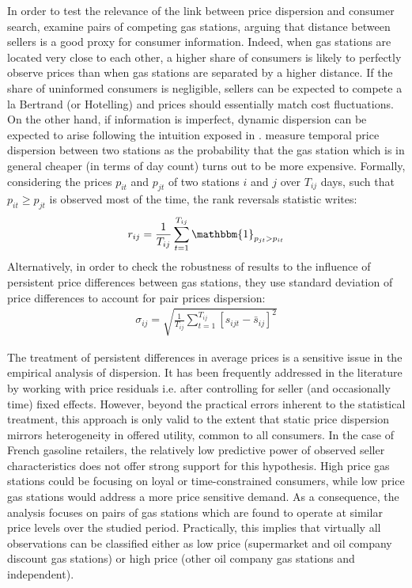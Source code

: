 \documentclass[english]{article}
\begin{document}
In order to test the relevance of the link between price dispersion and consumer search, \cite{TAP11} examine pairs of competing gas stations, arguing that distance between sellers is a good proxy for consumer information. Indeed, when gas stations are located very close to each other, a higher share of consumers is likely to perfectly observe prices than when gas stations are separated by a higher distance. If the share of uninformed consumers is negligible, sellers can be expected to compete a la Bertrand (or Hotelling) and prices should essentially match cost fluctuations. On the other hand, if information is imperfect, dynamic dispersion can be expected to arise following the intuition exposed in \cite{VAR80}. \cite{TAP11} measure temporal price dispersion between two stations as the probability that the gas station which is in general cheaper (in terms of day count) turns out to be more expensive. Formally, considering the prices $p_{it}$ and $p_{jt}$ of two stations $i$ and $j$ over $T_{ij}$ days, such that $p_{it} \ge p_{jt}$ is observed most of the time, the rank reversals statistic writes:
\begin{align*}
r_{ij} = \frac{1}{T_{ij}} \sum_{t=1}^{T_{ij}} \mathbbm{1}_{p_{jt} > p_{it}}
\end{align*}
Alternatively, in order to check the robustness of results to the influence of persistent price differences between gas stations, they use standard deviation of price differences to account for pair prices dispersion:
\begin{align*}
\sigma_{ij} = \sqrt{\frac{1}{T_{ij}} \sum_{t=1}^{T_{ij}} [s_{ijt} - \bar{s}_{ij}]^2}
\end{align*}

The treatment of persistent differences in average prices is a sensitive issue in the empirical analysis of dispersion. It has been frequently addressed in the literature by working with price residuals i.e. after controlling for seller (and occasionally time) fixed effects. However, beyond the practical errors inherent to the statistical treatment, this approach is only valid to the extent that static price dispersion mirrors heterogeneity in offered utility, common to all consumers. In the case of French gasoline retailers, the relatively low predictive power of observed seller characteristics does not offer strong support for this hypothesis. High price gas stations could be focusing on loyal or time-constrained consumers, while low price gas stations would address a more price sensitive demand. As a consequence, the analysis focuses on pairs of gas stations which are found to operate at similar price levels over the studied period. Practically, this implies that virtually all observations can be classified either as low price (supermarket and oil company discount gas stations) or high price (other oil company gas stations and independent).
\end{document}
